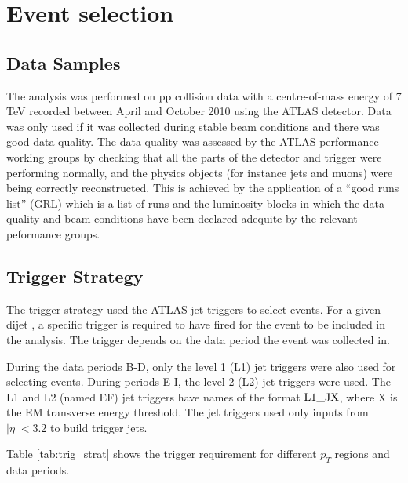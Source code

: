 \section {Event selection}
\label{sec:GBJ1:EvtSel}
\subsection{Data Samples}

The analysis was performed on  pp collision data with a centre-of-mass energy of 7 TeV recorded between April and October 2010 using the ATLAS detector. 
Data was only used if it was collected during stable beam conditions and there was good data quality. 
The data quality was assessed by the ATLAS performance working groups by checking that all the parts of the detector and trigger were performing normally, and the physics objects (for instance jets and muons) were being correctly reconstructed. 
This is achieved by the application of a ``good runs list'' (GRL) which is a list of runs and the luminosity blocks in which the data quality and beam conditions have been declared adequite by the relevant peformance groups.


\subsection{Trigger Strategy}

The trigger strategy used the ATLAS jet triggers to select events.
For a given dijet \ptb{}, a specific trigger is required to have fired for the event to be included in the analysis.
The trigger depends on the data period the event was collected in.

During the data periods B-D, only the level 1 (L1) jet triggers were also used for selecting events. 
During periods E-I, the level 2 (L2) jet triggers were used. 
The L1 and L2 (named EF) jet triggers have names of the format $\rm L1\_JX$, where X is the EM transverse energy threshold.
The jet triggers used only inputs from $|\eta|<3.2$ to build trigger jets.
 
Table \ref{tab:trig_strat} shows the trigger requirement for different $\bar{p_T}$ regions and data periods.

